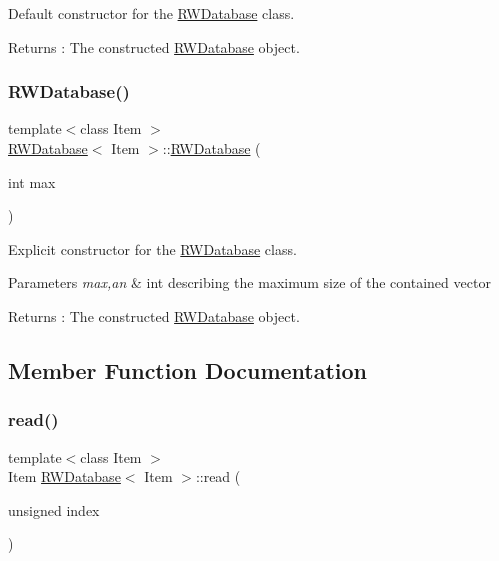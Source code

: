 Default constructor for the \hyperlink{class_r_w_database}{R\+W\+Database} class. 

\begin{DoxyReturn}{Returns}
\+: The constructed \hyperlink{class_r_w_database}{R\+W\+Database} object. 
\end{DoxyReturn}
\mbox{\label{class_r_w_database_aed3ea810bc64b4fcb41a8660b3a583de}} 
\subsubsection{\texorpdfstring{R\+W\+Database()}{RWDatabase()}\hspace{0.1cm}{\footnotesize\ttfamily [2/2]}}
{\footnotesize\ttfamily template$<$class Item $>$ \\
\hyperlink{class_r_w_database}{R\+W\+Database}$<$ Item $>$\+::\hyperlink{class_r_w_database}{R\+W\+Database} (\begin{DoxyParamCaption}\item[{int}]{max }\end{DoxyParamCaption})}



Explicit constructor for the \hyperlink{class_r_w_database}{R\+W\+Database} class. 


\begin{DoxyParams}{Parameters}
{\em max,an} & int describing the maximum size of the contained vector \\
\hline
\end{DoxyParams}
\begin{DoxyReturn}{Returns}
\+: The constructed \hyperlink{class_r_w_database}{R\+W\+Database} object. 
\end{DoxyReturn}


\subsection{Member Function Documentation}
\mbox{\label{class_r_w_database_acb53aad02a38e6e021ba61f63b35ba9a}} 
\subsubsection{\texorpdfstring{read()}{read()}}
{\footnotesize\ttfamily template$<$class Item $>$ \\
Item \hyperlink{class_r_w_database}{R\+W\+Database}$<$ Item $>$\+::read (\begin{DoxyParamCaption}\item[{unsigned}]{index }\end{DoxyParamCaption})}



